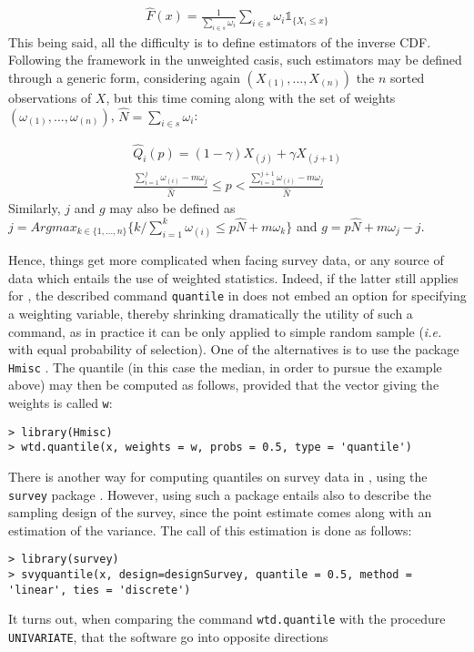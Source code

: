\begin{eqnarray}
\hat{F}(x) = \frac{1}{\sum_{i \in s}\omega_i}\sum_{i \in s}\omega_i \mathds{1}_{\{X_i \leq x\}}
\end{eqnarray}
This being said, all the difficulty is to define estimators of the inverse CDF. Following the framework in the unweighted casis, such estimators may be defined through a generic form, considering again $(X_{(1)},...,X_{(n)})$ the $n$ sorted observations of $X$, but this time coming along with the set of weights $(\omega_{(1)},...,\omega_{(n)})$, $\hat{N} = \sum_{i \in s}\omega_i$:

\begin{eqnarray}
\hat{Q}_i(p) = (1-\gamma) X_{(j)} + \gamma X_{(j+1)} \\
\frac{\sum_{i=1}^{j}\omega_{(i)}-m\omega_j}{\hat{N}} \leq p < \frac{\sum_{i=1}^{j+1}\omega_{(i)}-m\omega_j}{\hat{N}}
\end{eqnarray}
Similarly, $j$ and $g$ may also be defined as $j = Argmax_{k \in \{1,...,n\}} \{k/ \sum_{i=1}^{k} \omega_{(i)} \leq p\hat{N} + m\omega_k\}$ and $g = p\hat{N} + m\omega_j - j$.

\noindent Hence, things get more complicated when facing survey data, or any source of data which entails the use of weighted statistics. Indeed, if the latter still applies for \SAS, the described command \texttt{quantile} in \R does not embed an option for specifying a weighting variable, thereby shrinking dramatically the utility of such a command, as in practice it can be only applied to simple random sample (\textit{i.e.} with equal probability of selection). One of the alternatives is to use the package \texttt{Hmisc} \cite{hmisc2016h}. The quantile (in this case the median, in order to pursue the example above) may then be computed as follows, provided that the vector giving the weights is called \texttt{w}:
\lstset{language=R}
\begin{lstlisting}
> library(Hmisc)
> wtd.quantile(x, weights = w, probs = 0.5, type = 'quantile')
\end{lstlisting}
There is another way for computing quantiles on survey data in \R, using the \texttt{survey} package \cite{lumley2016survey}. However, using such a package entails also to describe the sampling design of the survey, since the point estimate comes along with an estimation of the variance. The call of this estimation is done as follows:
\lstset{language=R}
\begin{lstlisting}
> library(survey)
> svyquantile(x, design=designSurvey, quantile = 0.5, method = 'linear', ties = 'discrete')
\end{lstlisting}
It turns out, when comparing the \R command \texttt{wtd.quantile} with the \SAS procedure \texttt{UNIVARIATE}, that the software go into opposite directions

